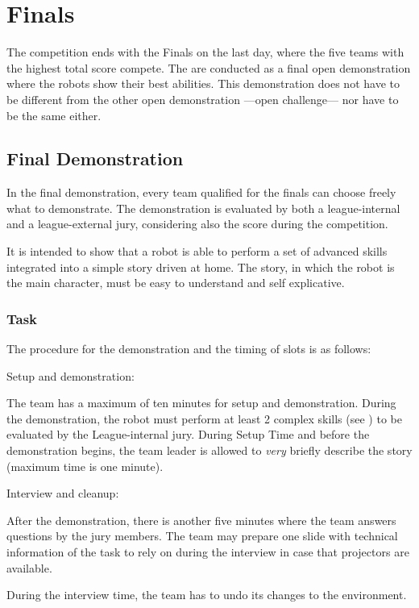 \chapter{Finals}

The competition ends with the Finals on the last day, where the five teams with the highest total score compete. The  are conducted as a final open demonstration where the robots show their best abilities. This demonstration does not have to be different from the other open demonstration ---open challenge--- nor have to be the same either.

\section{Final Demonstration}

In the final demonstration, every team qualified for the finals can choose freely what to demonstrate. The demonstration is evaluated by both a league-internal and a league-external jury, considering also the score during the competition.

It is intended to show that a robot is able to perform a set of advanced skills integrated into a simple story driven at home. The story, in which the robot is the main character, must be easy to understand and self explicative.

\subsection{Task}
The procedure for the demonstration and the timing of slots is as follows:
\begin{enumerate}
  {\bf\item Setup and demonstration:} The team has a maximum of ten minutes for setup and demonstration. During the demonstration, the robot must perform at least 2 complex skills (see ) to be evaluated by the League-internal jury. During Setup Time and before the demonstration begins, the team leader is allowed to \emph{very} briefly describe the story (maximum time is one minute). \\
  {\bf\item Interview and cleanup:} After the demonstration, there is another five minutes where the team answers questions by the jury members. The team may prepare one slide with technical information of the task to rely on during the interview in case that projectors are available.

  During the interview time, the team has to undo its changes to the environment.
\end{enumerate}

